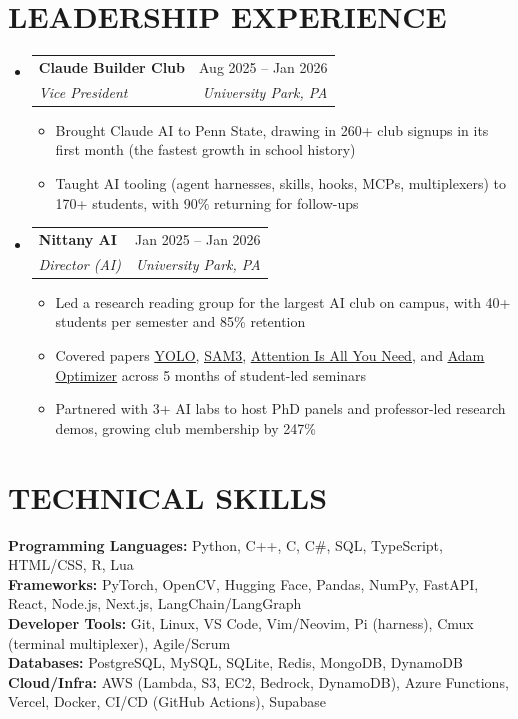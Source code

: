 \documentclass[letterpaper,11pt]{article}
\makeatletter
\newcommand{\resumeItem}[1]{
  \item\small{
    {#1 \vspace{-4pt}}
  }
}
\newcommand{\resumeSubheading}[4]{
  \item
    \begin{tabular*}{0.97\textwidth}[t]{l@{\extracolsep{\fill}}r}
      \textbf{#1} & #2 \\
      \textit{\small#3} & \textit{\small #4} \\
    \end{tabular*}\vspace{-7pt}
}
\newcommand{\resumeSubHeadingListStart}{\begin{itemize}[leftmargin=0.15in, label={}]}
\newcommand{\resumeSubHeadingListEnd}{\end{itemize}}
\newcommand{\resumeItemListStart}{\begin{itemize}}
\newcommand{\resumeItemListEnd}{\end{itemize}\vspace{-6pt}}
\makeatother
\begin{document}
\section{\textbf{LEADERSHIP EXPERIENCE}}
  \resumeSubHeadingListStart
    \resumeSubheading
      {Claude Builder Club}{Aug 2025 -- Jan 2026}
      {Vice President}{University Park, PA}
      \resumeItemListStart
              \resumeItem{Brought Claude AI to Penn State, drawing in 260+ club signups in its first month (the fastest growth in school history)}
              \resumeItem{Taught AI tooling (agent harnesses, skills, hooks, MCPs, multiplexers) to 170+ students, with 90\% returning for follow-ups}
        \resumeItemListEnd
    \resumeSubheading
      {Nittany AI}{Jan 2025 -- Jan 2026}
      {Director (AI)}{University Park, PA}
      \resumeItemListStart
              \resumeItem{Led a research reading group for the largest AI club on campus, with 40+ students per semester and 85\% retention}
              \resumeItem{Covered papers \href{https://arxiv.org/abs/1506.02640}{\underline{YOLO}}, \href{https://arxiv.org/abs/2511.16719}{\underline{SAM3}}, \href{https://arxiv.org/abs/1706.03762}{\underline{Attention Is All You Need}}, and \href{https://arxiv.org/abs/1412.6980}{\underline{Adam Optimizer}} across 5 months of student-led seminars}
              \resumeItem{Partnered with 3+ AI labs to host PhD panels and professor-led research demos, growing club membership by 247\%}
      \resumeItemListEnd
    \resumeSubHeadingListEnd

\section{\textbf{TECHNICAL SKILLS}}
 \begin{itemize}[leftmargin=0.15in, label={}, itemsep=-3pt, topsep=0pt]
    \small{\item{
     \textbf{Programming Languages:}{ Python, C++, C, C\#, SQL, TypeScript, HTML/CSS, R, Lua} \\
     \textbf{Frameworks:}{ PyTorch, OpenCV, Hugging Face, Pandas, NumPy, FastAPI, React, Node.js, Next.js, LangChain/LangGraph} \\
     \textbf{Developer Tools:}{ Git, Linux, VS Code, Vim/Neovim, Pi (harness), Cmux (terminal multiplexer), Agile/Scrum} \\
     \textbf{Databases:}{ PostgreSQL, MySQL, SQLite, Redis, MongoDB, DynamoDB} \\
     \textbf{Cloud/Infra:}{ AWS (Lambda, S3, EC2, Bedrock, DynamoDB), Azure Functions, Vercel, Docker, CI/CD (GitHub Actions), Supabase}
    }}
 \end{itemize}

\end{document}
